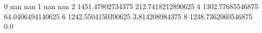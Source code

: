 0 nan nan
1 nan nan
2 1451.47802734375 212.7418212890625
4 1302.77685546875 64.0406494140625
6 1242.5504150390625 3.814208984375
8 1238.7362060546875 0.0
